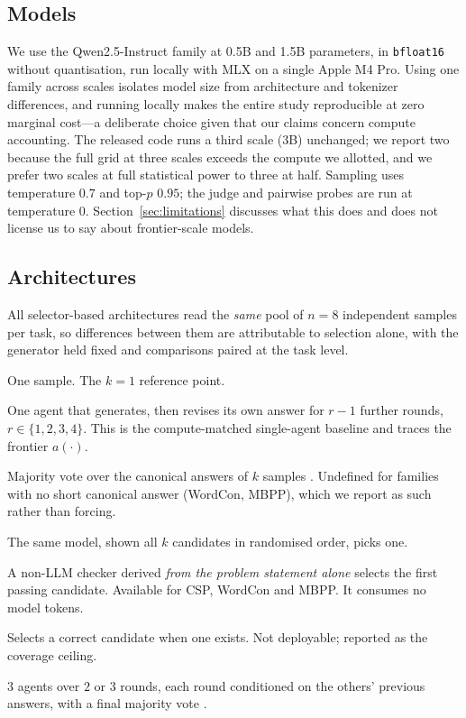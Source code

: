 \subsection{Models}

We use the Qwen2.5-Instruct family \citep{qwen2024qwen25} at 0.5B and 1.5B
parameters, in \texttt{bfloat16} without quantisation, run locally with MLX on
a single Apple M4 Pro. Using one family across scales isolates model size from
architecture and tokenizer differences, and running locally makes the entire
study reproducible at zero marginal cost---a deliberate choice given that our
claims concern compute accounting. The released code runs a third scale (3B)
unchanged; we report two because the full grid at three scales exceeds the
compute we allotted, and we prefer two scales at full statistical power to
three at half. Sampling uses temperature $0.7$ and
top-$p$ $0.95$; the judge and pairwise probes are run at temperature $0$.
Section~\ref{sec:limitations} discusses what this does and does not license us
to say about frontier-scale models.

\subsection{Architectures}

All selector-based architectures read the \emph{same} pool of $n=8$ independent
samples per task, so differences between them are attributable to selection
alone, with the generator held fixed and comparisons paired at the task level.

\begin{description}[leftmargin=0pt,itemsep=2pt,topsep=3pt,font=\normalfont\itshape]
\item[Single.] One sample. The $k=1$ reference point.
\item[Sequential refine.] One agent that generates, then revises its own answer
  for $r-1$ further rounds, $r \in \{1,2,3,4\}$. This is the compute-matched
  single-agent baseline and traces the frontier $a(\cdot)$.
\item[Self-consistency.] Majority vote over the canonical answers of $k$
  samples \citep{wang2023selfconsistency}. Undefined for families with no short
  canonical answer (WordCon, MBPP), which we report as such rather than forcing.
\item[Ensemble + LLM judge.] The same model, shown all $k$ candidates in
  randomised order, picks one.
\item[Ensemble + program verifier.] A non-LLM checker derived \emph{from the
  problem statement alone} selects the first passing candidate. Available for
  CSP, WordCon and MBPP. It consumes no model tokens.
\item[Ensemble + oracle.] Selects a correct candidate when one exists. Not
  deployable; reported as the coverage ceiling.
\item[Debate.] $3$ agents over $2$ or $3$ rounds, each round conditioned on the
  others' previous answers, with a final majority vote \citep{du2023debate}.
\end{description}

